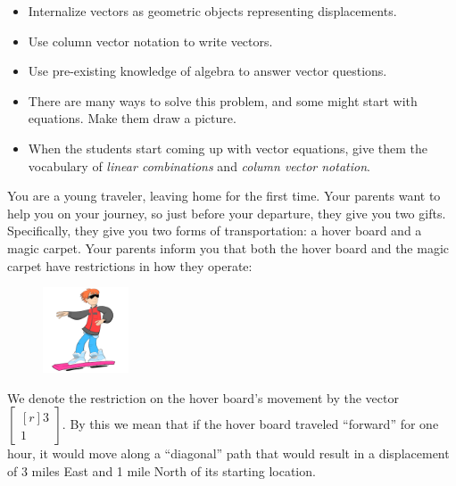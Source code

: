 \documentclass{problemset}
\newcommand{\mat}[1]{\begin{bmatrix*}[r]#1\end{bmatrix*}}
\begin{document}
\begin{annotation}
	\begin{goals}
		\begin{itemize}
			\item Internalize vectors as geometric objects representing
				displacements.

			\item Use column vector notation to write vectors.

			\item Use pre-existing knowledge of algebra to answer vector
				questions.
		\end{itemize}
	\end{goals}
	\begin{notes}

		\begin{itemize}
			\item There are many ways to solve this problem, and some
				might start with equations. Make them draw a picture.

			\item When the students start coming up with vector equations,
				give them the vocabulary of \emph{linear
				combinations}
				and \emph{column vector notation}.
		\end{itemize}
	\end{notes}
\end{annotation}
You are a young traveler, leaving home for the first time. Your parents
want to help you on your journey, so just before your departure, they give you two
gifts. Specifically, they give you two forms of transportation: a hover board and
a magic carpet. Your parents inform you that both the hover board and the magic carpet
have restrictions in how they operate: 

\begin{minipage}{\textwidth}
	\vspace{.5cm}
	\begin{figure}
	\vspace{-.8cm}
	\includegraphics[width=1in]{images/HoverBoard-small.png}
	\end{figure}

	We denote the restriction on the hover board's movement by the vector
	$\mat{3 \\1}$. By this we mean that if
	the hover board traveled ``forward'' for one hour, it would move along a
	``diagonal'' path that would result in a displacement of 3 miles East and
	1 mile North of its starting location.
\end{minipage}
\end{document}
